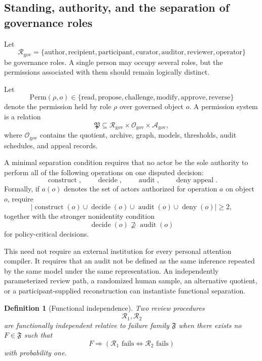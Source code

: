 \documentclass[11pt]{article}
\newtheorem{definition}{Definition}[section]
\theoremstyle{definition}
\begin{document}
\subsection{Standing, authority, and the separation of governance roles}

Let
\[
\mathcal{R}_{\mathrm{gov}}
=
\{
\mathrm{author},
\mathrm{recipient},
\mathrm{participant},
\mathrm{curator},
\mathrm{auditor},
\mathrm{reviewer},
\mathrm{operator}
\}
\]
be governance roles. A single person may occupy several roles, but the permissions associated with them should remain logically distinct.

Let
\[
\mathrm{Perm}(\rho,o)
\in
\{
\mathrm{read},
\mathrm{propose},
\mathrm{challenge},
\mathrm{modify},
\mathrm{approve},
\mathrm{reverse}
\}
\]
denote the permission held by role \(\rho\) over governed object \(o\). A permission system is a relation
\[
\mathfrak{P}
\subseteq
\mathcal{R}_{\mathrm{gov}}
\times
\mathcal{O}_{\mathrm{gov}}
\times
\mathcal{A}_{\mathrm{gov}},
\]
where \(\mathcal{O}_{\mathrm{gov}}\) contains the quotient, archive, graph, models, thresholds, audit schedules, and appeal records.

A minimal separation condition requires that no actor be the sole authority to perform all of the following operations on one disputed decision:
\[
\operatorname{construct},
\qquad
\operatorname{decide},
\qquad
\operatorname{audit},
\qquad
\operatorname{deny\ appeal}.
\]
Formally, if \(a(o)\) denotes the set of actors authorized for operation \(a\) on object \(o\), require
\[
\left|
\operatorname{construct}(o)
\cup
\operatorname{decide}(o)
\cup
\operatorname{audit}(o)
\cup
\operatorname{deny}(o)
\right|
\geq2,
\]
together with the stronger nonidentity condition
\[
\operatorname{decide}(o)
\not\supseteq
\operatorname{audit}(o)
\]
for policy-critical decisions.

This need not require an external institution for every personal attention compiler. It requires that an audit not be defined as the same inference repeated by the same model under the same representation. An independently parameterized review path, a randomized human sample, an alternative quotient, or a participant-supplied reconstruction can instantiate functional separation.

\begin{definition}[Functional independence]
Two review procedures
\[
\mathcal{R}_1,\mathcal{R}_2
\]
are functionally independent relative to failure family \(\mathfrak{F}\) when there exists no \(F\in\mathfrak{F}\) such that
\[
F
\Longrightarrow
\left(
\mathcal{R}_1\text{ fails}
\iff
\mathcal{R}_2\text{ fails}
\right)
\]
with probability one.
\end{definition}
\end{document}

